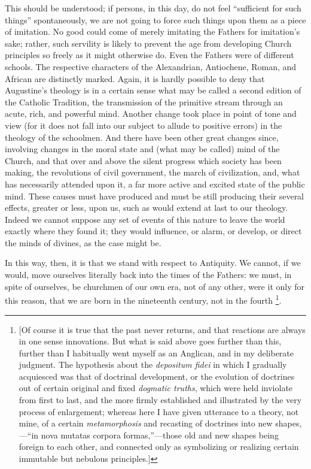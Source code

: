 This should be understood; if persons, in this
day, do not feel ``sufficient for such things'' spontaneously, we are
not going to force such things upon them as a piece of imitation. No
good could come of merely imitating the Fathers for imitation's sake;
rather, such servility is likely to prevent the age from developing
Church principles so freely as it might otherwise do. Even the Fathers
were of different schools. The respective characters of the
Alexandrian, Antiochene, Roman, and African are distinctly marked.
Again, it is hardly possible to deny that Augustine's theology is in a
certain sense what may be called a second edition of the Catholic
Tradition, the transmission of the primitive stream through an acute,
rich, and powerful mind. Another change took place in point of tone
and view (for it does not fall into our subject to allude to positive
errors) in the theology of the schoolmen. And there have been other
great changes since, involving changes in the moral state and (what
may be called) mind of the Church, and that over and above the silent
progress which society has been making, the revolutions of civil
government, the march of civilization, and, what has necessarily
attended upon it, a far more active and excited state of the public
mind. These causes must have produced and must be still producing
their several effects, greater or less, upon us, such as would extend
at last to our theology. Indeed we cannot suppose any set of events of
this nature to leave the world exactly where they found it; they would
influence, or alarm, or develop, or direct the minds of divines,
as the case might be.

In this way, then, it is that we stand with
respect to Antiquity. We cannot, if we would, move ourselves literally
back into the times of the Fathers: we must, in spite of ourselves, be
churchmen of our own era, not of any other, were it only for this
reason, that we are born in the nineteenth century, not in the fourth
\footnote{[Of course it is true that the past never returns, and that reactions
are always in one sense innovations. But what is said above goes
further than this, further than I habitually went myself as an
Anglican, and in my deliberate judgment. The hypothesis about the \emph{depositum
fidei} in which I gradually acquiesced was that of doctrinal
development, or the evolution of doctrines out of certain original and
fixed \emph{dogmatic truths}, which were held inviolate from first to
last, and the more firmly established and illustrated by the very
process of enlargement; whereas here I have given utterance to a
theory, not mine, of a certain \emph{metamorphosis} and recasting of
doctrines into new shapes,—``in nova mutatas corpora formas,''—those
old and new shapes being foreign to each other, and connected only as
symbolizing or realizing certain immutable but nebulous principles.]}.

